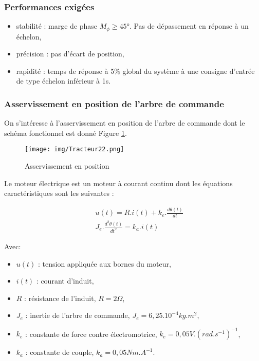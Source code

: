 \subsubsection{Performances exigées}

\begin{itemize}
 \item stabilité : marge de phase $M_{\phi} \geq 45$°. Pas de dépassement en réponse à un échelon,
 \item précision : pas d'écart de position,
 \item rapidité : temps de réponse à 5\% global du système à une consigne d'entrée de type échelon inférieur à 1s.
\end{itemize}

\subsubsection{Asservissement en position de l'arbre de commande}

On s'intéresse à l'asservissement en position de l'arbre de commande dont le schéma fonctionnel est donné Figure \ref{fig22}.

\newpage

\begin{figure}[!h]
\centering\texttt{[image: img/Tracteur22.png]}
\caption{Asservissement en position}
\label{fig22}
\end{figure}

Le moteur électrique est un moteur à courant continu dont les équations caractéristiques sont les suivantes :

\begin{eqnarray}
& & u(t)=R.i(t)+k_e.\frac{d\theta(t)}{dt} \nonumber \\
& & J_e.\frac{d^2\theta(t)}{dt^2}=k_a.i(t) \nonumber
\end{eqnarray}

Avec:
\begin{itemize}
 \item $u(t)$ : tension appliquée aux bornes du moteur,
 \item $i(t)$ : courant d'induit,
 \item $R$ : résistance de l'induit, $R=2\Omega$,
 \item $J_e$ : inertie de l'arbre de commande, $J_e=6,25.10^{-4}kg.m^2$,
 \item $k_e$ : constante de force contre électromotrice, $k_e=0,05V.(rad.s^{-1})^{-1}$,
 \item $k_a$ : constante de couple, $k_a=0,05Nm.A^{-1}$.
\end{itemize}

